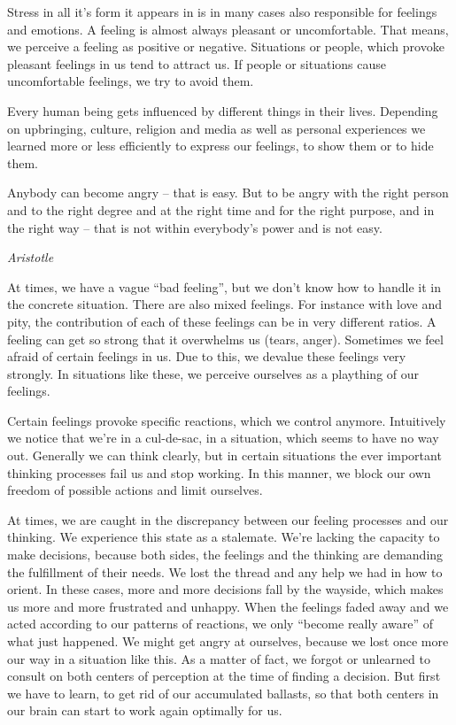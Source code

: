 \documentclass[../main.tex]{subfiles}
\begin{document}
Stress in all it's form it appears in is in many cases also responsible for feelings and emotions.
A feeling is almost always pleasant or uncomfortable.
That means, we perceive a feeling as positive or negative.
Situations or people, which provoke pleasant feelings in us tend to attract us.
If people or situations cause uncomfortable feelings, we try to avoid them.

Every human being gets influenced by different things in their lives.
Depending on upbringing, culture, religion and media as well as personal experiences we learned more or less efficiently to express our feelings, to show them or to hide them.

\epigraph{Anybody can become angry -- that is easy. But to be angry with the right person and to the right degree and at the right time and for the right purpose, and in the right way -- that is not within everybody's power and is not easy.}{\textit{Aristotle}}


At times, we have a vague ``bad feeling'', but we don't know how to handle it in the concrete situation.
There are also mixed feelings.
For instance with love and pity, the contribution of each of these feelings can be in very different ratios.
A feeling can get so strong that it overwhelms us (tears, anger).
Sometimes we feel afraid of certain feelings in us.
Due to this, we devalue these feelings very strongly.
In situations like these, we perceive ourselves as a plaything of our feelings.

Certain feelings provoke specific reactions, which we control anymore.
Intuitively we notice that we're in a cul-de-sac, in a situation, which seems to have no way out.
Generally we can think clearly, but in certain situations the ever important thinking processes fail us and stop working.
In this manner, we block our own freedom of possible actions and limit ourselves.

At times, we are caught in the discrepancy between our feeling processes and our thinking.
We experience this state as a stalemate.
We're lacking the capacity to make decisions, because both sides, the feelings and the thinking are demanding the fulfillment of their needs.
We lost the thread and any help we had in how to orient.
In these cases, more and more decisions fall by the wayside, which makes us more and more frustrated and unhappy.
When the feelings faded away and we acted according to our patterns of reactions, we only ``become really aware'' of what just happened.
We might get angry at ourselves, because we lost once more our way in a situation like this.
As a matter of fact, we forgot or unlearned to consult on both centers of perception at the time of finding a decision.
But first we have to learn, to get rid of our accumulated ballasts, so that both centers in our brain can start to work again optimally for us.
\end{document}
